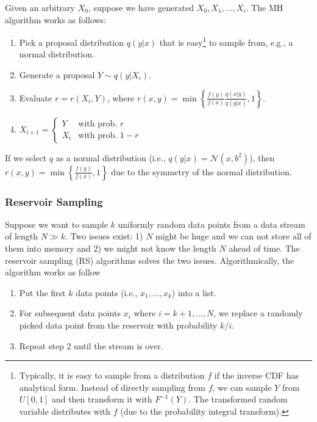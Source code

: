         Given an arbitrary $X_0$, suppose we have generated $X_0, X_1, \ldots, X_i$.
        The MH algorithm works as follows:
            \begin{enumerate}
                \item Pick a proposal distribution $q(y|x)$ that is easy\footnote{Typically, it is easy to sample from a distribution $f$ if the inverse CDF has analytical form. 
                Instead of directly sampling from $f$, we can sample $Y$ from $U[0, 1]$ and then transform it with $F^{-1}(Y)$. The transformed random variable distributes with $f$ (due to the probability integral transform). } to sample from, e.g., a normal distribution. 
                \item Generate a proposal $Y \sim q(y | X_i)$.
                \item Evaluate $r=r(X_i, Y)$, where $r(x, y) = \min\left\{ \frac{f(y)}{f(x)}\frac{q(x|y)}{q(y|x)}, 1\right\}$.
                \item $X_{i+1} = \begin{cases} Y & \text{with prob. } r \\ X_i & \text{with prob. } 1-r  \end{cases}$
            \end{enumerate}

        If we select $q$ as a normal distribution (i.e., $q(y|x) = \mathcal{N}(x, b^2)$), then  $r(x, y) = \min \left\{ \frac{f(y)}{f(x)}, 1 \right\}$ due to the symmetry of the normal distribution.


    \subsubsection{Reservoir Sampling}
        Suppose we want to sample $k$ uniformly random data points from a data stream of length $N \gg k$.
        Two issues exist: 1) $N$ might be huge and we can not store all of them into memory and 2) we might not know the length $N$ ahead of time.
        The reservoir sampling (RS) algorithms solves the two issues. 
        Algorithmically, the algorithm works as follow
            \begin{enumerate}
                \item Put the first $k$ data points (i.e., $x_1, \ldots, x_k$) into a list. 
                \item For subsequent data points $x_i$ where $i=k+1, \ldots, N$, we replace a randomly picked data point from the reservoir with probability $k/i$.
                \item Repeat step 2 until the stream is over. 
            \end{enumerate}
        
